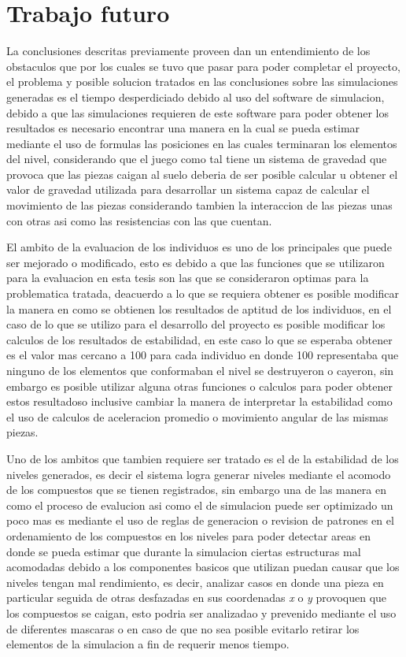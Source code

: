 \section{Trabajo futuro}
\label{section:future-work}

La conclusiones descritas previamente proveen dan un entendimiento de los
obstaculos que por los cuales se tuvo que pasar para poder completar el
proyecto, el problema y posible solucion tratados en las conclusiones sobre las
simulaciones generadas es el tiempo desperdiciado debido al uso del software de
simulacion, debido a que las simulaciones requieren de este software para poder
obtener los resultados es necesario encontrar una manera en la cual se pueda
estimar mediante el uso de formulas las posiciones en las cuales terminaran los
elementos del nivel, considerando que el juego como tal tiene un sistema de
gravedad que provoca que las piezas caigan al suelo deberia de ser posible
calcular u obtener el valor de gravedad utilizada para desarrollar un sistema
capaz de calcular el movimiento de las piezas considerando tambien la
interaccion de las piezas unas con otras asi como las resistencias con las que
cuentan.

El ambito de la evaluacion de los individuos es uno de los principales que puede
ser mejorado o modificado, esto es debido a que las funciones que se utilizaron
para la evaluacion en esta tesis son las que se consideraron optimas para la
problematica tratada, deacuerdo a lo que se requiera obtener es posible
modificar la manera en como se obtienen los resultados de aptitud de los
individuos, en el caso de lo que se utilizo para el desarrollo del proyecto es
posible modificar los calculos de los resultados de estabilidad, en este caso lo
que se esperaba obtener es el valor mas cercano a 100 para cada individuo en
donde 100 representaba que ninguno de los elementos que conformaban el nivel se
destruyeron o cayeron, sin embargo es posible utilizar alguna otras funciones o
calculos para poder obtener estos resultadoso inclusive cambiar la manera de
interpretar la estabilidad como el uso de calculos de aceleracion promedio o
movimiento angular de las mismas piezas.

Uno de los ambitos que tambien requiere ser tratado es el de la estabilidad de
los niveles generados, es decir el sistema logra generar niveles mediante el
acomodo de los compuestos que se tienen registrados, sin embargo una de las
manera en como el proceso de evalucion asi como el de simulacion puede ser
optimizado un poco mas es mediante el uso de reglas de generacion o revision de
patrones en el ordenamiento de los compuestos en los niveles para poder detectar
areas en donde se pueda estimar que durante la simulacion ciertas estructuras
mal acomodadas debido a los componentes basicos que utilizan puedan causar que
los niveles tengan mal rendimiento, es decir, analizar casos en donde una pieza
en particular seguida de otras desfazadas en sus coordenadas \textit{x} o
\textit{y} provoquen que los compuestos se caigan, esto podria ser analizadao y
prevenido mediante el uso de diferentes mascaras o en caso de que no sea posible
evitarlo retirar los elementos de la simulacion a fin de requerir menos tiempo.


